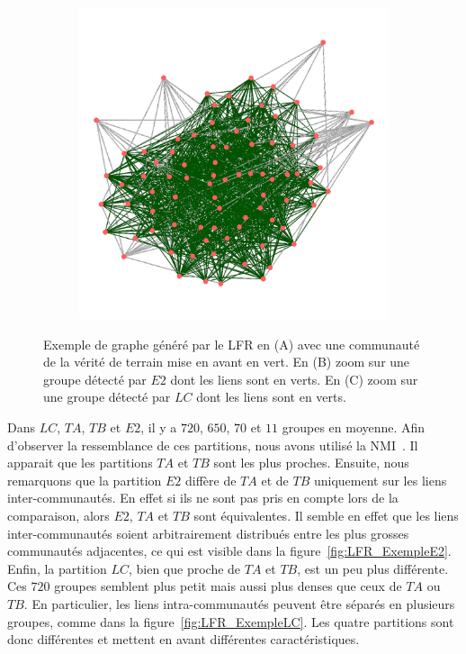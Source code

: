 \begin{figure}
\begin{subfigure}{0.31\textwidth}
		\caption{}		
	\end{subfigure}
	\begin{subfigure}{0.31\textwidth}
		\includegraphics[width=\linewidth]{img/ExpectedNodes/LF/Ahn.png}
		\caption{}		
	\end{subfigure}

	\caption{Exemple de graphe généré par le LFR en (A) avec une communauté de la vérité de terrain mise en avant en vert.
	En (B) zoom sur une groupe détecté par $E2$ dont les liens sont en verts.
	En (C) zoom sur une groupe détecté par $LC$ dont les liens sont en verts. }
	\label{fig:LFR_Exemple}
\end{figure}


Dans $LC$, $TA$, $TB$ et $E2$, il y a $720$, $650$, $70$ et $11$ groupes en moyenne.
Afin d'observer la ressemblance de ces partitions, nous avons utilisé la NMI~\cite{Danon2005}.
Il apparait que les partitions $TA$ et $TB$ sont les plus proches.
Ensuite, nous remarquons que la partition $E2$ diffère de $TA$ et de $TB$ uniquement sur les liens inter-communautés.
En effet si ils ne sont pas pris en compte lors de la comparaison, alors $E2$, $TA$ et $TB$ sont équivalentes.
Il semble en effet que les liens inter-communautés soient arbitrairement distribués entre les plus grosses communautés adjacentes, ce qui est visible dans la figure~\ref{fig:LFR_ExempleE2}.
Enfin, la partition $LC$, bien que proche de $TA$ et $TB$, est un peu plus différente.
Ces $720$ groupes semblent plus petit mais aussi plus denses que ceux de $TA$ ou $TB$.
En particulier, les liens intra-communautés peuvent être séparés en plusieurs groupes, comme dans la figure~\ref{fig:LFR_ExempleLC}.
Les quatre partitions sont donc différentes et mettent en avant différentes caractéristiques.


